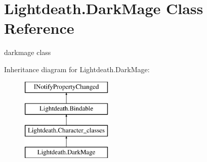 \hypertarget{class_lightdeath_1_1_dark_mage}{}\section{Lightdeath.\+Dark\+Mage Class Reference}
\label{class_lightdeath_1_1_dark_mage}


darkmage class  


Inheritance diagram for Lightdeath.\+Dark\+Mage\+:\begin{figure}[H]
\begin{center}
\leavevmode
\includegraphics[height=4.000000cm]{class_lightdeath_1_1_dark_mage}
\end{center}
\end{figure}
